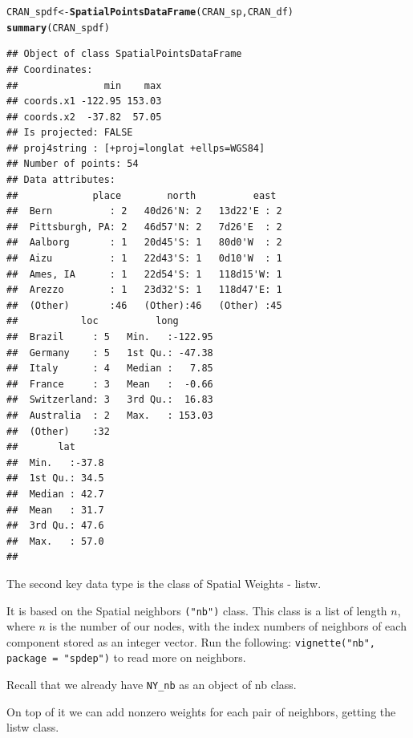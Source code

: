\documentclass{article}\usepackage[]{graphicx}\usepackage[]{color}
\makeatletter
\newcommand{\hlstd}[1]{\textcolor[rgb]{0.345,0.345,0.345}{#1}}%
\newcommand{\hlkwb}[1]{\textcolor[rgb]{0.69,0.353,0.396}{#1}}%
\newcommand{\hlkwd}[1]{\textcolor[rgb]{0.737,0.353,0.396}{\textbf{#1}}}%
\newenvironment{kframe}{%
 \def\at@end@of@kframe{}%
 \ifinner\ifhmode%
  \def\at@end@of@kframe{\end{minipage}}%
  \begin{minipage}{\columnwidth}%
 \fi\fi%
 \def\FrameCommand##1{\hskip\@totalleftmargin \hskip-\fboxsep
 \colorbox{shadecolor}{##1}\hskip-\fboxsep
     \hskip-\linewidth \hskip-\@totalleftmargin \hskip\columnwidth}%
 \MakeFramed {\advance\hsize-\width
   \@totalleftmargin\z@ \linewidth\hsize
   \@setminipage}}%
 {\par\unskip\endMakeFramed%
 \at@end@of@kframe}
\newenvironment{knitrout}{}{} %
\makeatother
\begin{document}
\begin{knitrout}
\begin{kframe}
\begin{alltt}
\hlstd{CRAN_spdf} \hlkwb{<-} \hlkwd{SpatialPointsDataFrame}\hlstd{(CRAN_sp, CRAN_df)}
\hlkwd{summary}\hlstd{(CRAN_spdf)}
\end{alltt}
\begin{verbatim}
## Object of class SpatialPointsDataFrame
## Coordinates:
##               min    max
## coords.x1 -122.95 153.03
## coords.x2  -37.82  57.05
## Is projected: FALSE 
## proj4string : [+proj=longlat +ellps=WGS84]
## Number of points: 54
## Data attributes:
##             place        north          east   
##  Bern          : 2   40d26'N: 2   13d22'E : 2  
##  Pittsburgh, PA: 2   46d57'N: 2   7d26'E  : 2  
##  Aalborg       : 1   20d45'S: 1   80d0'W  : 2  
##  Aizu          : 1   22d43'S: 1   0d10'W  : 1  
##  Ames, IA      : 1   22d54'S: 1   118d15'W: 1  
##  Arezzo        : 1   23d32'S: 1   118d47'E: 1  
##  (Other)       :46   (Other):46   (Other) :45  
##           loc          long        
##  Brazil     : 5   Min.   :-122.95  
##  Germany    : 5   1st Qu.: -47.38  
##  Italy      : 4   Median :   7.85  
##  France     : 3   Mean   :  -0.66  
##  Switzerland: 3   3rd Qu.:  16.83  
##  Australia  : 2   Max.   : 153.03  
##  (Other)    :32                    
##       lat       
##  Min.   :-37.8  
##  1st Qu.: 34.5  
##  Median : 42.7  
##  Mean   : 31.7  
##  3rd Qu.: 47.6  
##  Max.   : 57.0  
## 
\end{verbatim}
\end{kframe}
\end{knitrout}

The second key data type is the class of Spatial Weights - listw. 

It is based on the Spatial neighbors \verb+("nb")+ class. This class is a list of length $n$, where $n$ is the number of our nodes, 
with the index numbers of neighbors of each component stored as an integer vector. Run the following: \verb+vignette("nb", package = "spdep")+ to read more on neighbors.

Recall that we already have \verb+NY_nb+ as an object of nb class. 

On top of it we can add nonzero weights for each pair of neighbors, getting the listw class. 
\end{document}
